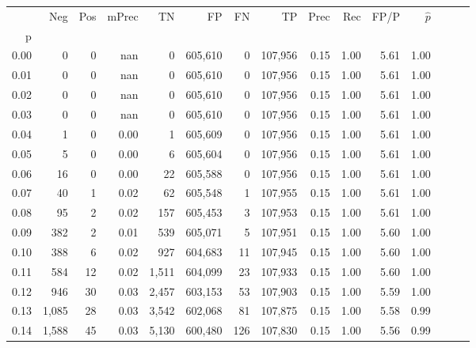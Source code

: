 \begin{tabular}{rrrrrrrrrrrrrrr}
\toprule
{} &     Neg &    Pos & mPrec &       TN &       FP &       FN &       TP &  Prec &   Rec &  FP/P & $\hat{p}$ \\
p    &         &        &       &          &          &          &          &       &       &       &           \\
\midrule
0.00 &       0 &      0 &   nan &        0 &  605,610 &        0 &  107,956 &  0.15 &  1.00 &  5.61 &      1.00 \\
0.01 &       0 &      0 &   nan &        0 &  605,610 &        0 &  107,956 &  0.15 &  1.00 &  5.61 &      1.00 \\
0.02 &       0 &      0 &   nan &        0 &  605,610 &        0 &  107,956 &  0.15 &  1.00 &  5.61 &      1.00 \\
0.03 &       0 &      0 &   nan &        0 &  605,610 &        0 &  107,956 &  0.15 &  1.00 &  5.61 &      1.00 \\
0.04 &       1 &      0 &  0.00 &        1 &  605,609 &        0 &  107,956 &  0.15 &  1.00 &  5.61 &      1.00 \\
0.05 &       5 &      0 &  0.00 &        6 &  605,604 &        0 &  107,956 &  0.15 &  1.00 &  5.61 &      1.00 \\
0.06 &      16 &      0 &  0.00 &       22 &  605,588 &        0 &  107,956 &  0.15 &  1.00 &  5.61 &      1.00 \\
0.07 &      40 &      1 &  0.02 &       62 &  605,548 &        1 &  107,955 &  0.15 &  1.00 &  5.61 &      1.00 \\
0.08 &      95 &      2 &  0.02 &      157 &  605,453 &        3 &  107,953 &  0.15 &  1.00 &  5.61 &      1.00 \\
0.09 &     382 &      2 &  0.01 &      539 &  605,071 &        5 &  107,951 &  0.15 &  1.00 &  5.60 &      1.00 \\
0.10 &     388 &      6 &  0.02 &      927 &  604,683 &       11 &  107,945 &  0.15 &  1.00 &  5.60 &      1.00 \\
0.11 &     584 &     12 &  0.02 &    1,511 &  604,099 &       23 &  107,933 &  0.15 &  1.00 &  5.60 &      1.00 \\
0.12 &     946 &     30 &  0.03 &    2,457 &  603,153 &       53 &  107,903 &  0.15 &  1.00 &  5.59 &      1.00 \\
0.13 &   1,085 &     28 &  0.03 &    3,542 &  602,068 &       81 &  107,875 &  0.15 &  1.00 &  5.58 &      0.99 \\
0.14 &   1,588 &     45 &  0.03 &    5,130 &  600,480 &      126 &  107,830 &  0.15 &  1.00 &  5.56 &      0.99 \\

\end{tabular}
